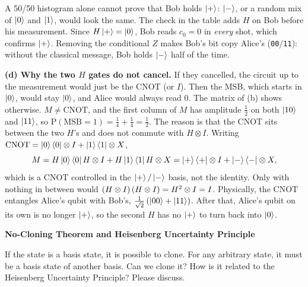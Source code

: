 \documentclass[a4paper, 10pt]{article}
\begin{document}
\begin{solution}
	\begin{remark}
		A 50/50 histogram alone cannot prove that Bob holds \( \ket{+} \): \( \ket{-} \), or a random mix of \( \ket{0} \) and \( \ket{1} \), would look the same.
		The check in the table adds \( H \) on Bob before his measurement. Since \( H\ket{+} = \ket{0} \), Bob reads \( c_0 = 0 \) in \emph{every} shot, which confirms \( \ket{+} \).
		Removing the conditional \( Z \) makes Bob's bit copy Alice's (\texttt{00}/\texttt{11}): without the classical message, Bob holds \( \ket{-} \) half of the time.
	\end{remark}

	\noindent \textbf{(d) Why the two \( H \) gates do not cancel.} If they cancelled, the circuit up to the measurement would just be the CNOT (or \( I \)). Then the MSB, which starts in \( \ket{0} \), would stay \( \ket{0} \), and Alice would always read \( 0 \).
	The matrix of (b) shows otherwise. \( M \neq \mathrm{CNOT} \), and the first column of \( M \) has amplitude \( \tfrac{1}{2} \) on both \( \ket{10} \) and \( \ket{11} \), so \( \mathrm{P}(\text{MSB} = 1) = \tfrac{1}{4} + \tfrac{1}{4} = \tfrac{1}{2} \).
	The reason is that the CNOT sits between the two \( H \)'s and does not commute with \( H \otimes I \). Writing \( \mathrm{CNOT} = \ket{0}\bra{0} \otimes I + \ket{1}\bra{1} \otimes X \),
	\[
		M = H\ket{0}\bra{0}H \otimes I + H\ket{1}\bra{1}H \otimes X = \ket{+}\bra{+} \otimes I + \ket{-}\bra{-} \otimes X,
	\]
	which is a CNOT controlled in the \( \ket{+}/\ket{-} \) basis, not the identity. Only with nothing in between would \( \left(H \otimes I\right)\left(H \otimes I\right) = H^2 \otimes I = I \).
	Physically, the CNOT entangles Alice's qubit with Bob's, \( \tfrac{1}{\sqrt{2}}\left(\ket{00} + \ket{11}\right) \). After that, Alice's qubit on its own is no longer \( \ket{+} \), so the second \( H \) has no \( \ket{+} \) to turn back into \( \ket{0} \).
\end{solution}

\newpage

\begin{problem}
\textbf{No-Cloning Theorem and Heisenberg Uncertainty Principle}
\par If the state is a basis state, it is possible to clone.
For any arbitrary state, it must be a basis state of another basis.
Can we clone it? How is it related to the Heisenberg Uncertainty Principle? Please discuss.
\end{problem}
\end{document}

